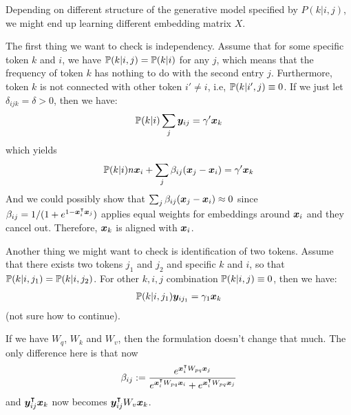 Depending on different structure of the generative model specified by $P(k|i, j)$, we might end up learning different embedding matrix $X$. 

The first thing we want to check is independency. Assume that for some specific token $k$ and $i$, we have $\mathbb{P}(k|i, j) = \mathbb{P}(k|i)$ for any $j$, which means that the frequency of token $k$ has nothing to do with the second entry $j$. Furthermore, token $k$ is not connected with other token $i'\neq i$, i.e, $\mathbb{P}(k|i', j) \equiv 0$. If we just let $\delta_{ijk} = \delta > 0$, then we have:
\begin{equation}
    \mathbb{P}(k|i) \sum_j {\bm{y}}_{ij} = \gamma' {\bm{x}}_k
\end{equation}
which yields
\begin{equation}
    \mathbb{P}(k|i) n{\bm{x}}_i + \sum_j \beta_{ij}({\bm{x}}_j-{\bm{x}}_i) = \gamma' {\bm{x}}_k
\end{equation}
And we could possibly show that $\sum_j \beta_{ij}({\bm{x}}_j-{\bm{x}}_i) \approx 0$ since $\beta_{ij} = 1 / (1 + e^{1 - {\bm{x}}_i^\intercal{\bm{x}}_j})$ applies equal weights for embeddings around ${\bm{x}}_i$ and they cancel out. Therefore, ${\bm{x}}_k$ is aligned with ${\bm{x}}_i$.  

Another thing we might want to check is identification of two tokens. Assume that there exists two tokens $j_1$ and $j_2$ and specific $k$ and $i$, so that $\mathbb{P}(k|i,j_1) = \mathbb{P}(k|i,j_2)$. For other $k, i, j$ combination $\mathbb{P}(k|i,j) \equiv 0$, then we have:
\begin{eqnarray}
    \mathbb{P}(k|i,j_1) {\bm{y}}_{ij_1} = \gamma_1 {\bm{x}}_k
\end{eqnarray}
(not sure how to continue). 

If we have $W_q$, $W_k$ and $W_v$, then the formulation doesn't change that much. The only difference here is that now 
\begin{equation}
    \beta_{ij} := \frac{e^{{\bm{x}}_i^\intercal W_{pq} {\bm{x}}_j}}{e^{{\bm{x}}_i^\intercal W_{pq} {\bm{x}}_i} + e^{{\bm{x}}_i^\intercal W_{pq} {\bm{x}}_j}}
\end{equation}
and ${\bm{y}}_{ij}^\intercal {\bm{x}}_k$ now becomes ${\bm{y}}_{ij}^\intercal W_v {\bm{x}}_k$. 

\iffalse
Alternatively, we could think about $L = |\vw^\t \vz - y|$ where $y$ is some predefined target. 
\fi